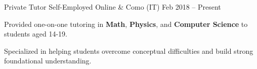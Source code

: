
\cventry
{Private Tutor}
{Self-Employed}
{Online \& Como (IT)}
{Feb 2018 -- Present}
{
    \begin{cvitems}
        \item {Provided one-on-one tutoring in \textbf{Math}, \textbf{Physics}, and \textbf{Computer Science} to students aged 14-19.}
        \item {Specialized in helping students overcome conceptual difficulties and build strong foundational understanding.}
    \end{cvitems}
}
